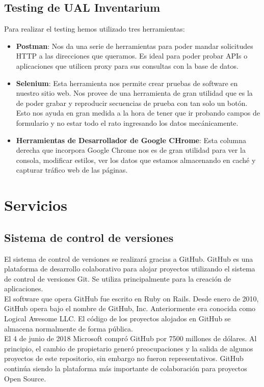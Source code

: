 \subsection{Testing de UAL Inventarium}
Para realizar el testing hemos utilizado tres herramientas:
\begin{itemize}
    \item \textbf{Postman}: Nos da una serie de herramientas para poder mandar solicitudes HTTP a las direcciones que queramos. Es ideal para poder probar APIs o aplicaciones que utilicen proxy para sus consultas con la base de datos.
    \item \textbf{Selenium}: Esta herramienta nos permite crear pruebas de software en nuestro sitio web. Nos provee de una herramienta de gran utilidad que es la de poder grabar y reproducir secuencias de prueba con tan solo un botón. Esto nos ayuda en gran medida a la hora de tener que ir probando campos de formulario y no estar todo el rato ingresando los datos mecánicamente.
    \item \textbf{Herramientas de Desarrollador de Google CHrome}: Esta columna derecha que incorpora Google Chrome nos es de gran utilidad para ver la consola, modificar estilos, ver los datos que estamos almacenando en caché y capturar tráfico web de las páginas.
\end{itemize}

\section{Servicios}

\subsection{Sistema de control de versiones}
El sistema de control de versiones se realizará gracias a GitHub. GitHub es una plataforma de desarrollo colaborativo para alojar proyectos utilizando el sistema de control de versiones Git. Se utiliza principalmente para la creación de aplicaciones.
\\El software que opera GitHub fue escrito en Ruby on Rails. Desde enero de 2010, GitHub opera bajo el nombre de GitHub, Inc. Anteriormente era conocida como Logical Awesome LLC. El código de los proyectos alojados en GitHub se almacena normalmente de forma pública.
\\El 4 de junio de 2018 Microsoft compró GitHub por 7500 millones de dólares. Al principio, el cambio de propietario generó preocupaciones y la salida de algunos proyectos de este repositorio, sin embargo no fueron representativos. GitHub continúa siendo la plataforma más importante de colaboración para proyectos Open Source.


